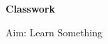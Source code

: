 \documentclass{article}
\begin{document}

{\LARGE \textbf{Classwork}}

{\small Aim: Learn Something}
	
	\hlinepagewidth
	
\end{document}
